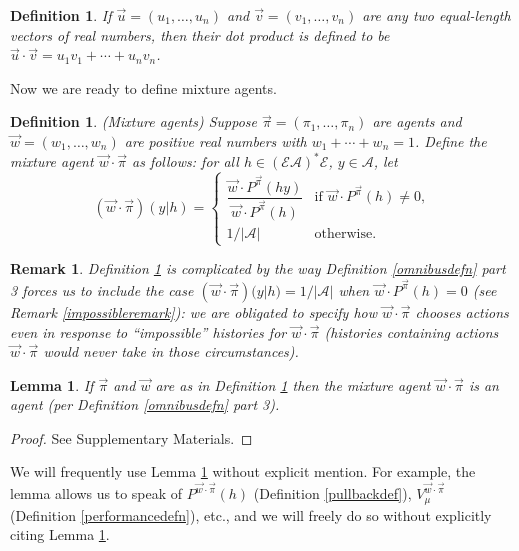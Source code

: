 \documentclass[twoside]{article}
\newtheorem{definition}[theorem]{Definition}
\newtheorem{remark}[theorem]{Remark}
\newtheorem{lemma}[theorem]{Lemma}
\begin{document}
\begin{definition}
\label{dotproductdefn}
    If $\vec u=(u_1,\ldots,u_n)$ and
    $\vec v=(v_1,\ldots,v_n)$ are any two equal-length
    vectors of real numbers, then their \emph{dot product}
    is defined to be $\vec u\cdot \vec v=u_1v_1+\cdots+u_nv_n$.
\end{definition}

Now we are ready to define mixture agents.

\begin{definition}
\label{maindefn}
    (Mixture agents)
    Suppose $\vec\pi=(\pi_1,\ldots,\pi_n)$ are agents and $\vec w=(w_1,\ldots,w_n)$
    are positive real numbers with $w_1+\cdots+w_n=1$.
    Define the \emph{mixture agent} $\vec w\cdot\vec\pi$ as follows: for all
    $h\in (\mathcal E\mathcal A)^*\mathcal E$, $y\in\mathcal A$, let
    \[
        (\vec w\cdot\vec\pi)(y|h)
        =
        \begin{cases}
            \dfrac{\vec w\cdot {P^{\vec\pi}}(hy)}{\vec w\cdot {P^{\vec\pi}}(h)}
            &\mbox{if $\vec w\cdot {P^{\vec\pi}}(h)\not=0$,}\\
            1/|\mathcal{A}| &\mbox{otherwise.}
        \end{cases}
    \]
\end{definition}

\begin{remark}
    Definition \ref{maindefn} is complicated by the way
    Definition \ref{omnibusdefn} part 3
    forces us to include the case
    $(\vec w\cdot\vec\pi)(y|h)=1/|\mathcal A|$ when
    $\vec w\cdot {P^{\vec\pi}}(h)=0$
    (see Remark \ref{impossibleremark}): we are obligated to specify how
    $\vec w\cdot\vec\pi$ chooses actions even in response to ``impossible''
    histories for $\vec w\cdot\vec\pi$ (histories containing actions
    $\vec w\cdot\vec\pi$ would never take in those circumstances).
\end{remark}

\begin{lemma}
\label{mixturereallyisanagent}
    If $\vec\pi$ and $\vec w$ are as in Definition \ref{maindefn}
    then the mixture agent $\vec w\cdot\vec\pi$ is an agent
    (per Definition \ref{omnibusdefn} part 3).
\end{lemma}

\begin{proof}
    See Supplementary Materials.
\end{proof}

We will frequently use Lemma \ref{mixturereallyisanagent} without explicit mention.
For example, the lemma allows us to speak of $P^{\vec w\cdot \vec\pi}(h)$
(Definition \ref{pullbackdef}), $V^{\vec w\cdot\vec\pi}_{\mu}$
(Definition \ref{performancedefn}), etc., and we will freely do so without
explicitly citing Lemma \ref{mixturereallyisanagent}.
\end{document}
